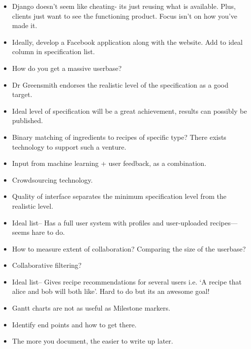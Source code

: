 \begin{itemize}
	\item Django doesn’t seem like cheating- its just reusing what is available. Plus, clients just want to see the functioning product. Focus isn’t on how you’ve made it.
	
	\item Ideally, develop a Facebook application along with the website. Add to ideal column in specification list.
	
	\item How do you get a massive userbase?
	
	\item Dr Greensmith endorses the realistic level of the specification as a good target.
	
	\item Ideal level of specification will be a great achievement, results can possibly be published.
	
	\item Binary matching of ingredients to recipes of specific type? There exists technology to support such a venture.
	
	\item Input from machine learning + user feedback, as a combination.
	
	\item Crowdsourcing technology.
	
	\item Quality of interface separates the minimum specification level from the realistic level.
	
	\item Ideal list-- Has a full user system with profiles and user-uploaded recipes—seems hare to do.
	
	\item How to measure extent of collaboration? Comparing the size of the userbase? 
	
	\item Collaborative filtering?
	
	\item Ideal list-- Gives recipe recommendations for several users i.e. ‘A recipe that alice and bob will both like’. Hard to do but its an awesome goal!
	
	\item Gantt charts are not as useful as Milestone markers.
	
	\item Identify end points and how to get there.
	
	\item The more you document, the easier to write up later.
	

\end{itemize}
